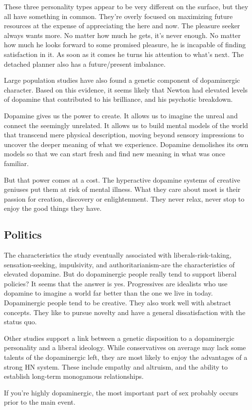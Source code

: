 \documentclass[ebook,12pt,oneside,openany]{memoir}
\begin{document}
These three personality types appear to be very different on the surface, but they all have something in common.
They're overly focused on maximizing future resources at the expense of appreciating the here and now.
The pleasure seeker always wants more. No matter how much he gets, it's never enough.
No matter how much he looks forward to some promised pleasure, he is incapable of finding satisfaction in it.
As soon as it comes he turns his attention to what's next.
The detached planner also has a future/present imbalance.

Large population studies have also found a genetic component of dopaminergic character.
Based on this evidence, it seems likely that Newton had elevated levels of dopamine that contributed to his brilliance, 
and his psychotic breakdown.

Dopamine gives us the power to create. It allows us to imagine the unreal and connect the seemingly unrelated.
It allows us to build mental models of the world that transcend mere physical description, moving beyond sensory 
impressions to uncover the deeper meaning of what we experience.
Dopamine demolishes its own models so that we can start fresh and find new meaning in what was once familiar.

But that power comes at a cost. The hyperactive dopamine systems of creative geniuses put them at risk of mental illness.
What they care about most is their passion for creation, discovery or enlightenment.
They never relax, never stop to enjoy the good things they have.

\subsection{Politics}
The characteristics the study eventually associated with liberals-risk-taking, sensation-seeking,
impulsivity, and authoritarianism-are the characteristics of elevated dopamine.
But do dopaminergic people really tend to support liberal policies? It seems that the answer is yes.
Progressives are idealists who use dopamine to imagine a world far better than the one we live in today.
Dopaminergic people tend to be creative. 
They also work well with abstract concepts. 
They like to pursue novelty and have a general dissatisfaction with the status quo.

Other studies support a link between a genetic disposition to a dopaminergic personality
and a liberal ideology. While conservatives on average may lack some talents of the dopaminergic left,
they are most likely to enjoy the advantages of a strong HN system.
These include empathy and altruism, and the ability to establish long-term monogamous relationships.

If you're highly dopaminergic, the most important part of sex probably occurs prior to the main event.
\end{document}
